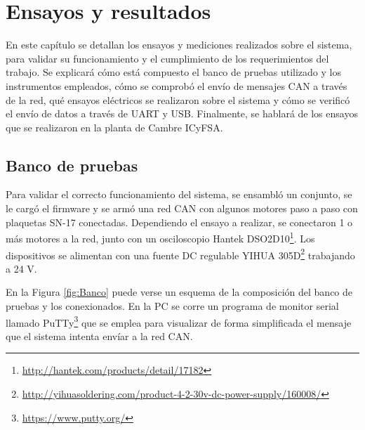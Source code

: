 
\chapter{Ensayos y resultados} %

\label{Chapter4} %

En este capítulo se detallan los ensayos y mediciones realizados sobre el sistema, para validar su funcionamiento y el cumplimiento de los requerimientos del trabajo. Se explicará cómo está compuesto el banco de pruebas utilizado y los instrumentos empleados, cómo se comprobó el envío de mensajes CAN a través de la red, qué ensayos eléctricos se realizaron sobre el sistema y cómo se verificó el envío de datos a través de UART y USB. Finalmente, se hablará de los ensayos que se realizaron en la planta de Cambre ICyFSA. 


\section{Banco de pruebas}

Para validar el correcto funcionamiento del sistema, se ensambló un conjunto, se le cargó el firmware y se armó una red CAN con algunos motores paso a paso con plaquetas SN-17 conectadas. Dependiendo el ensayo a realizar, se conectaron 1 o más motores a la red, junto con un osciloscopio Hantek DSO2D10\footnote{\url{http://hantek.com/products/detail/17182}}. Los dispositivos se alimentan con una fuente DC regulable YIHUA 305D\footnote{\url{http://yihuasoldering.com/product-4-2-30v-dc-power-supply/160008/}} trabajando a 24 V.

En la Figura \ref{fig:Banco} puede verse un esquema de la composición del banco de pruebas y los conexionados. En la PC se corre un programa de monitor serial llamado PuTTy\footnote{\url{https://www.putty.org/}} que se emplea para visualizar de forma simplificada el mensaje que el sistema intenta envíar a la red CAN.

